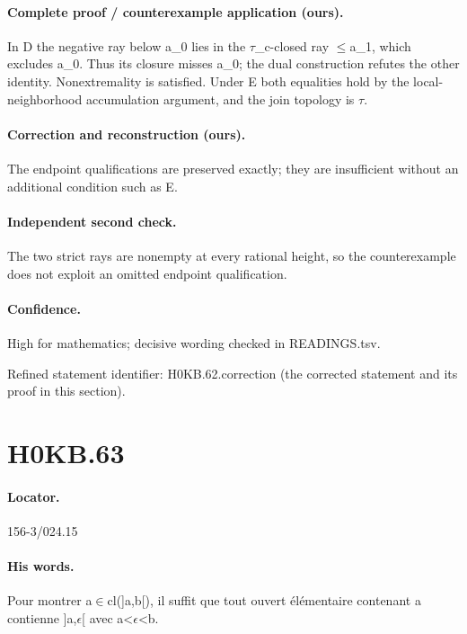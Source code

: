 \paragraph{Complete proof / counterexample application (ours).} In D the negative ray below a\_0 lies in the \ensuremath{\tau}\_c-closed ray \ensuremath{\leq}a\_1, which excludes a\_0. Thus its closure misses a\_0; the dual construction refutes the other identity. Nonextremality is satisfied. Under E both equalities hold by the local-neighborhood accumulation argument, and the join topology is \ensuremath{\tau}.

\paragraph{Correction and reconstruction (ours).} The endpoint qualifications are preserved exactly; they are insufficient without an additional condition such as E.

\paragraph{Independent second check.} The two strict rays are nonempty at every rational height, so the counterexample does not exploit an omitted endpoint qualification.

\paragraph{Confidence.} High for mathematics; decisive wording checked in READINGS.tsv.

\noindent Refined statement identifier: H0KB.62.correction (the corrected statement and its proof in this section).

\section*{H0KB.63}\label{statement:H0KB.63}
\paragraph{Locator.} 156-3/024.15

\paragraph{His words.} Pour montrer a\ensuremath{\in}cl(]a,b[), il suffit que tout ouvert élémentaire contenant a contienne ]a,\ensuremath{\epsilon}[ avec a<\ensuremath{\epsilon}<b.

